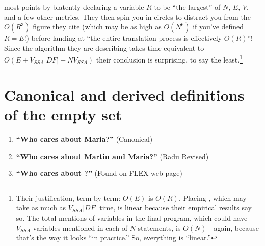 \documentclass[12pt,titlepage,twoside]{article}
\let\oldsection\section
\renewcommand{\section}{\setcounter{figure}{0}\oldsection}
\begin{document}
\begin{enumerate}
most points by blatently declaring a variable $R$ to be ``the
largest'' of $N$, $E$, $V$, and a few other metrics.  They then spin
you in circles to distract you from the $O(R^3)$ figure they cite
(which may be as high as $O(N^6)$ if you've defined $R=E$!) before
landing at ``the entire translation process is effectively $O(R)$''!
Since the algorithm they are describing takes time equivalent to
$O(E+V_{SSA}|{DF}|+NV_{SSA})$ their conclusion is surprising, to say
the least.\footnote{Their justification, term by term: $O(E)$ is
$O(R)$.  Placing , which may take as much as
$V_{SSA}|{DF}|$ time, is linear because their empirical results say
so.  The total mentions of variables in the final program, which could
have $V_{SSA}$ variables mentioned in each of $N$ statements, is
$O(N)$---again, because that's the way it looks ``in practice.''  So,
everything is ``linear.''}
\end{enumerate}

\section{Canonical and derived definitions of the empty set}
\begin{enumerate}
\item \textbf{``Who cares about Maria?''} (Canonical) \cite{marinov99}
\item \textbf{``Who cares about Martin and Maria?''} (Radu Revised)
\item \textbf{``Who cares about ?''} (Found on FLEX web page)
\end{enumerate}
\end{document}
